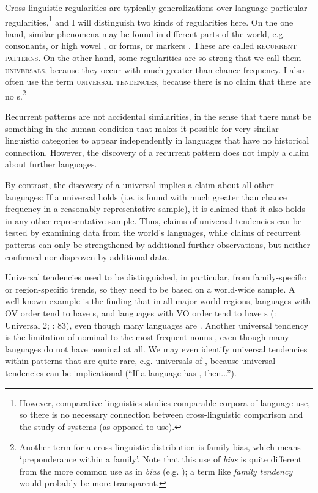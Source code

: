\documentclass[output=paper]{langsci/langscibook}
\begin{document}
Cross-linguistic regularities are typically generalizations over language-particular regularities,\footnote{However, comparative  linguistics studies comparable corpora of language use, so there is no necessary connection between cross-linguistic comparison and the study of systems (as opposed to use).} and I will distinguish two kinds of regularities here. On the one hand, similar phenomena may be found in different parts of the world, e.g.  consonants, or high vowel , or   forms, or  markers \citep{Creissels2014}. These are called \textsc{recurrent patterns}. On the other hand, some regularities are so strong that we call them \textsc{universals}, because they occur with much greater than chance frequency. I also often use the term \textsc{universal tendencies}, because there is no claim that there are no s.\footnote{Another term for a cross-linguistic distribution is  family bias, which means ‘preponderance within a family’. Note that this use of \textit{bias} is quite different from the more common use as in \textit{ bias} (e.g. \citealt{TverskyKahneman1974}); a term like \textit{family tendency} would probably be more transparent.}

Recurrent patterns are not accidental similarities, in the sense that there must be something in the human condition that makes it possible for very similar linguistic categories to appear independently in languages that have no historical connection. However, the discovery of a recurrent pattern does not imply a claim about further languages.

By contrast, the discovery of a universal implies a claim about all other languages: If a universal holds (i.e. is found with much greater than chance frequency in a reasonably representative sample), it is claimed that it also holds in any other representative sample. Thus, claims of universal tendencies can be tested by examining data from the world’s languages, while claims of recurrent patterns can only be strengthened by additional further observations, but neither confirmed nor disproven by additional data. 

Universal tendencies need to be distinguished, in particular, from family-specific or region-specific trends, so they need to be based on a world-wide sample. A well-known example is the finding that in all major world regions, languages with OV order tend to have s, and languages with VO order tend to have s (\citealt{Greenberg1963}: Universal 2; \citealt{Dryer1992}: 83), even though many languages are . Another universal tendency is the limitation of nominal  to the most frequent nouns \citep{Vafaeian2013}, even though many languages do not have nominal  at all. We may even identify universal tendencies within patterns that are quite rare, e.g. universals of  \citep{Yu2007}, because universal tendencies can be implicational (“If a language has , then...”).
\end{document}
